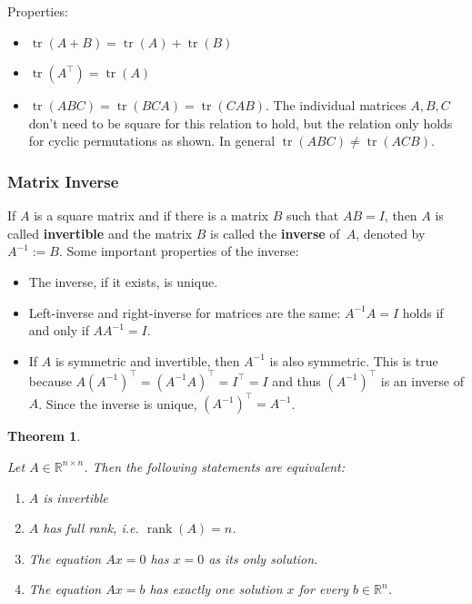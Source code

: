 \documentclass[
  a4paper,
]{article}
\providecommand{\tightlist}{%
  \setlength{\itemsep}{0pt}\setlength{\parskip}{0pt}}
\newtheorem{theorem}{Theorem}[section]
\theoremstyle{definition}
\theoremstyle{definition}
\theoremstyle{definition}
\theoremstyle{definition}
\theoremstyle{remark}
\begin{document}
Properties:

\begin{itemize}
\item
  \(\mathop{\mathrm{tr}}(A+B) = \mathop{\mathrm{tr}}(A) + \mathop{\mathrm{tr}}(B)\)
\item
  \(\mathop{\mathrm{tr}}(A^\top) = \mathop{\mathrm{tr}}(A)\)
\item
  \(\mathop{\mathrm{tr}}(ABC) = \mathop{\mathrm{tr}}(BCA) = \mathop{\mathrm{tr}}(CAB)\). The individual matrices \(A, B, C\) don't
  need to be square for this relation to hold, but the relation only holds for
  cyclic permutations as shown. In general \(\mathop{\mathrm{tr}}(ABC) \neq \mathop{\mathrm{tr}}(ACB)\).
\end{itemize}

\subsubsection{Matrix Inverse}\label{matrix-inverse}

If \(A\) is a square matrix and if there is a matrix \(B\) such that
\(AB = I\), then \(A\) is called \textbf{invertible} and the matrix \(B\) is
called the \textbf{inverse} of~\(A\), denoted by \(A^{-1} := B\).
Some important properties of the inverse:

\begin{itemize}
\item
  The inverse, if it exists, is unique.
\item
  Left-inverse and right-inverse for matrices are the same:
  \(A^{-1} A = I\) holds if and only if \(A A^{-1} = I\).
\item
  If \(A\) is symmetric and invertible, then \(A^{-1}\) is also
  symmetric. This is true because \(A (A^{-1})^\top = (A^{-1} A)^\top
  = I^\top = I\) and thus \((A^{-1})^\top\) is an inverse of \(A\).
  Since the inverse is unique, \((A^{-1})^\top = A^{-1}\).
\end{itemize}

\begin{theorem}
\protect\hypertarget{thm:matrix-inverse}{}\label{thm:matrix-inverse}

Let \(A \in \mathbb{R}^{n\times n}\). Then the following statements are equivalent:

\begin{enumerate}
\def\labelenumi{\alph{enumi}.}
\tightlist
\item
  \(A\) is invertible
\item
  \(A\) has full rank, \emph{i.e.} \(\mathop{\mathrm{rank}}(A) = n\).
\item
  The equation \(Ax = 0\) has \(x = 0\) as its only solution.
\item
  The equation \(Ax = b\) has exactly one solution \(x\) for every
  \(b\in\mathbb{R}^n\).
\end{enumerate}

\end{theorem}
\end{document}
